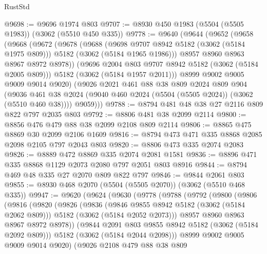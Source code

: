 \begin{lexlean}{RustStd}
\begin{coremodule}
@9698 := @9696 @1974 @803
@9707 := @8930 @450 @1983 (@5504 (@5505 @1983)) (@3062 (@5510 @450 @335))
@9778 := @9640
    (@9644
      (@9652
        (@9658
          (@9668
            (@9672
              (@9678
                (@9688
                  (@9698 @9707 @8942 @5182 (@3062 (@5184 @1975 @809)))
                  @5182
                  (@3062 (@5184 @1965 @1986)))
                @8957
                @8960
                @8963
                @8967
                @8972
                @8978))
            (@9696 @2004 @803 @9707 @8942 @5182 (@3062 (@5184 @2005 @809)))
            @5182
            (@3062 (@5184 @1957 @2011)))
          @8999
          @9002
          @9005
          @9009
          @9014
          @9020)
        (@9026
          @2021
          @461
          @88
          @38
          @809
          @2024
          @809
          @904
          (@9036 @461 @38 @2024 (@9040 @460 @2024 (@5504 (@5505 @2024)) (@3062 (@5510 @460 @38))))
          @9059)))
@9788 := @8794 @481 @48 @38 @27 @2116 @809 @822 @797 @2035 @803
@9792 := @8806 @481 @38 @2099 @2114
@9800 := @8856 @476 @479 @88 @38 @2099 @2108 @809 @2114
@9806 := @8865 @475 @8869 @30 @2099 @2106 @1609
@9816 := @8794 @473 @471 @335 @8868 @2085 @2098 @2105 @797 @2043 @803
@9820 := @8806 @473 @335 @2074 @2083
@9826 := @8889 @472 @8869 @335 @2074 @2081 @1581
@9836 := @8896 @471 @335 @8868 @1129 @2073 @2080 @797 @2051 @803 @8916
@9844 := @8794 @469 @48 @335 @27 @2070 @809 @822 @797
@9846 := @9844 @2061 @803
@9855 := @8930 @468 @2070 (@5504 (@5505 @2070)) (@3062 (@5510 @468 @335))
@9947 := @9620
    (@9624
      (@9630
        (@9778
          (@9788
            (@9792
              (@9800
                (@9806
                  (@9816
                    (@9820
                      (@9826
                        (@9836
                          (@9846 @9855 @8942 @5182 (@3062 (@5184 @2062 @809)))
                          @5182
                          (@3062 (@5184 @2052 @2073)))
                        @8957
                        @8960
                        @8963
                        @8967
                        @8972
                        @8978))
                    (@9844 @2091 @803 @9855 @8942 @5182 (@3062 (@5184 @2092 @809)))
                    @5182
                    (@3062 (@5184 @2044 @2098)))
                  @8999
                  @9002
                  @9005
                  @9009
                  @9014
                  @9020)
                (@9026
                  @2108
                  @479
                  @88
                  @38
                  @809

\end{coremodule}
\end{lexlean}
